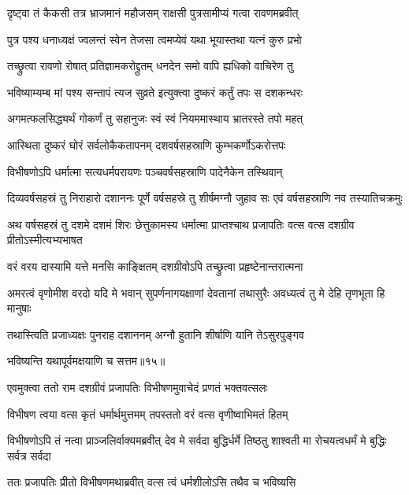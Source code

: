 \twolineshloka
{दृष्ट्वा तं कैकसी तत्र भ्राजमानं महौजसम्}
{राक्षसी पुत्रसामीप्यं गत्वा रावणमब्रवीत्} %

\twolineshloka
{पुत्र पश्य धनाध्यक्षं ज्वलन्तं स्वेन तेजसा}
{त्वमप्येवं यथा भूयास्तथा यत्नं कुरु प्रभो} %

\twolineshloka
{तच्छ्रुत्वा रावणो रोषात् प्रतिज्ञामकरोद्द्रुतम्}
{धनदेन समो वापि ह्यधिको वाचिरेण तु} %

\twolineshloka
{भविष्याम्यम्ब मां पश्य सन्तापं त्यज सुव्रते}
{इत्युक्त्वा दुष्करं कर्तुं तपः स दशकन्धरः} %

\twolineshloka
{अगमत्फलसिद्ध्यर्थं गोकर्णं तु सहानुजः}
{स्वं स्वं नियममास्थाय भ्रातरस्ते तपो महत्} %

\twolineshloka
{आस्थिता दुष्करं घोरं सर्वलोकैकतापनम्}
{दशवर्षसहस्राणि कुम्भकर्णोऽकरोत्तपः} %

\twolineshloka
{विभीषणोऽपि धर्मात्मा सत्यधर्मपरायणः}
{पञ्चवर्षसहस्राणि पादेनैकेन तस्थिवान्} %

\threelineshloka
{दिव्यवर्षसहस्रं तु निराहारो दशाननः}
{पूर्णे वर्षसहस्रे तु शीर्षमग्नौ जुहाव सः}
{एवं वर्षसहस्राणि नव तस्यातिचक्रमुः} %

\threelineshloka
{अथ वर्षसहस्रं तु दशमे दशमं शिरः}
{छेत्तुकामस्य धर्मात्मा प्राप्तश्चाथ प्रजापतिः}
{वत्स वत्स दशग्रीव प्रीतोऽस्मीत्यभ्यभाषत} %

\twolineshloka
{वरं वरय दास्यामि यत्ते मनसि काङ्क्षितम्}
{दशग्रीवोऽपि तच्छ्रुत्वा प्रहृष्टेनान्तरात्मना} %

\threelineshloka
{अमरत्वं वृणोमीश वरदो यदि मे भवान्}
{सुपर्णनागयक्षाणां देवतानां तथासुरैः}
{अवध्यत्वं तु मे देहि तृणभूता हि मानुषाः} %

\twolineshloka
{तथास्त्विति प्रजाध्यक्षः पुनराह दशाननम्}
{अग्नौ हुतानि शीर्षाणि यानि तेऽसुरपुङ्गव} %

{भविष्यन्ति यथापूर्वमक्षयाणि च सत्तम॥१५॥} %


\twolineshloka
{एवमुक्त्वा ततो राम दशग्रीवं प्रजापतिः}
{विभीषणमुवाचेदं प्रणतं भक्तवत्सलः} %

\twolineshloka
{विभीषण त्वया वत्स कृतं धर्मार्थमुत्तमम्}
{तपस्ततो वरं वत्स वृणीष्वाभिमतं हितम्} %

\threelineshloka
{विभीषणोऽपि तं नत्वा प्राञ्जलिर्वाक्यमब्रवीत्}
{देव मे सर्वदा बुद्धिर्धर्मे तिष्ठतु शाश्वती}
{मा रोचयत्वधर्मं मे बुद्धिः सर्वत्र सर्वदा} %

\twolineshloka
{ततः प्रजापतिः प्रीतो विभीषणमथाब्रवीत्}
{वत्स त्वं धर्मशीलोऽसि तथैव च भविष्यसि} %


